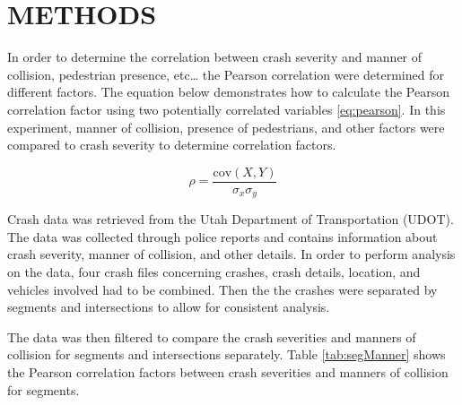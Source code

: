 \documentclass[3p, authoryear]{elsarticle} %
\begin{document}
\hypertarget{methods}{%
\section{METHODS}\label{methods}}

In order to determine the correlation between crash severity and manner of collision, pedestrian presence, etc\ldots{}
the Pearson correlation were determined for different factors. The
equation below demonstrates how to calculate the Pearson correlation factor
using two potentially correlated variables \eqref{eq:pearson}. In this experiment,
manner of collision, presence of pedestrians, and other factors were compared to crash severity to determine correlation factors.

\begin{equation}
  \rho = \frac{\text{cov}(X,Y)}{\sigma_x \sigma_y}
  \label{eq:pearson}
\end{equation}

Crash data was retrieved from the Utah Department of Transportation (UDOT). The data was collected through police reports and contains information about crash severity, manner of collision, and other details. In order to perform analysis on the data, four crash files concerning crashes, crash details, location, and vehicles involved had to be combined. Then the the crashes were separated by segments and intersections to allow for consistent analysis.

The data was then filtered to compare the crash severities and manners of collision for segments and intersections separately.
Table \ref{tab:segManner} shows the Pearson correlation factors between crash severities and manners of collision for segments.
\end{document}
